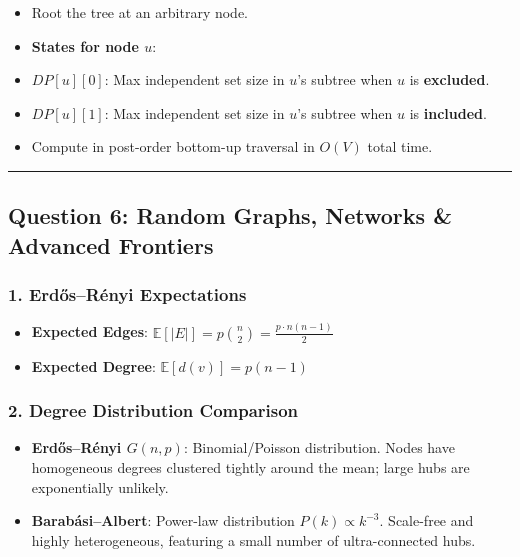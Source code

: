 \documentclass[
]{book}
\providecommand{\tightlist}{%
  \setlength{\itemsep}{0pt}\setlength{\parskip}{0pt}}
\theoremstyle{definition}
\theoremstyle{definition}
\theoremstyle{definition}
\theoremstyle{definition}
\theoremstyle{remark}
\begin{document}
\begin{itemize}
\item
  Root the tree at an arbitrary node.
\item
  \textbf{States for node \(u\)}:
\item
  \(DP[u][0]\): Max independent set size in \(u\)'s subtree when \(u\) is \textbf{excluded}.
\item
  \(DP[u][1]\): Max independent set size in \(u\)'s subtree when \(u\) is \textbf{included}.
\item
  Compute in post-order bottom-up traversal in \(O(V)\) total time.
\end{itemize}

\begin{center}\rule{0.5\linewidth}{0.5pt}\end{center}

\subsection{Question 6: Random Graphs, Networks \& Advanced Frontiers}\label{question-6-random-graphs-networks-advanced-frontiers}

\subsubsection{1. Erdős--Rényi Expectations}\label{erdux151sruxe9nyi-expectations}

\begin{itemize}
\tightlist
\item
  \textbf{Expected Edges}: \(\mathbb{E}[\vert{}E\vert{}] = p \binom{n}{2} = \frac{p \cdot n(n-1)}{2}\)
\item
  \textbf{Expected Degree}: \(\mathbb{E}[d(v)] = p(n - 1)\)
\end{itemize}

\subsubsection{2. Degree Distribution Comparison}\label{degree-distribution-comparison}

\begin{itemize}
\tightlist
\item
  \textbf{Erdős--Rényi \(G(n, p)\)}: Binomial/Poisson distribution. Nodes have homogeneous degrees clustered tightly around the mean; large hubs are exponentially unlikely.
\item
  \textbf{Barabási--Albert}: Power-law distribution \(P(k) \propto k^{-3}\). Scale-free and highly heterogeneous, featuring a small number of ultra-connected hubs.
\end{itemize}
\end{document}

